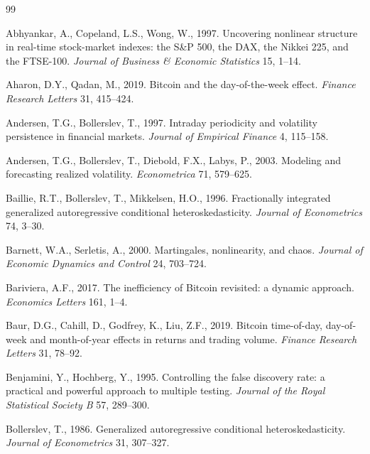 \documentclass[11pt,a4paper]{article}
\begin{document}
\begin{thebibliography}{99}
\setlength{\itemsep}{2pt}
\small

Abhyankar, A., Copeland, L.S., Wong, W., 1997. Uncovering nonlinear structure in real-time stock-market indexes: the
S\&P 500, the DAX, the Nikkei 225, and the FTSE-100. \emph{Journal of Business \& Economic Statistics} 15, 1--14.

Aharon, D.Y., Qadan, M., 2019. Bitcoin and the day-of-the-week effect. \emph{Finance Research Letters} 31, 415--424.

Andersen, T.G., Bollerslev, T., 1997. Intraday periodicity and volatility persistence in financial markets.
\emph{Journal of Empirical Finance} 4, 115--158.

Andersen, T.G., Bollerslev, T., Diebold, F.X., Labys, P., 2003. Modeling and forecasting realized volatility.
\emph{Econometrica} 71, 579--625.

Baillie, R.T., Bollerslev, T., Mikkelsen, H.O., 1996. Fractionally integrated generalized autoregressive conditional
heteroskedasticity. \emph{Journal of Econometrics} 74, 3--30.

Barnett, W.A., Serletis, A., 2000. Martingales, nonlinearity, and chaos. \emph{Journal of Economic Dynamics and
Control} 24, 703--724.

Bariviera, A.F., 2017. The inefficiency of Bitcoin revisited: a dynamic approach. \emph{Economics Letters} 161, 1--4.

Baur, D.G., Cahill, D., Godfrey, K., Liu, Z.F., 2019. Bitcoin time-of-day, day-of-week and month-of-year effects in
returns and trading volume. \emph{Finance Research Letters} 31, 78--92.

Benjamini, Y., Hochberg, Y., 1995. Controlling the false discovery rate: a practical and powerful approach to multiple
testing. \emph{Journal of the Royal Statistical Society B} 57, 289--300.

Bollerslev, T., 1986. Generalized autoregressive conditional heteroskedasticity. \emph{Journal of Econometrics} 31,
307--327.


\end{thebibliography}
\end{document}

